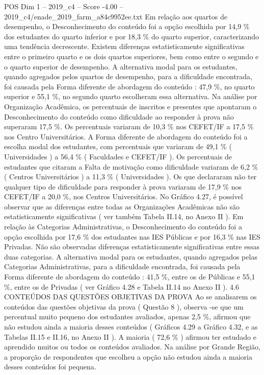\begin{textsample}{POS Dim 1 – 2019\_c4 – Score -4.00 – 2019\_c4/enade\_2019\_farm\_a84c9952ee.txt}
Em relação aos quartos de desempenho, o Desconhecimento do conteúdo foi a opção escolhida por 14,9 \% dos estudantes do quarto inferior e por 18,3 \% do quarto superior, caracterizando uma tendência decrescente.
Existem diferenças estatisticamente significativas entre o primeiro quarto e os dois quartos superiores, bem como entre o segundo e o quarto superior de desempenho.
A alternativa modal para os estudantes, quando agregados pelos quartos de desempenho, para a dificuldade encontrada, foi causada pela Forma diferente de abordagem do conteúdo : 47,9 \%, no quarto superior e 55,1 \%, no segundo quarto escolheram essa alternativa.
Na análise por Organização Acadêmica, os percentuais de inscritos e presentes que apontaram o Desconhecimento do conteúdo como dificuldade ao responder à prova não superaram 17,5 \%.
Os percentuais variaram de 10,3 \% nos CEFET/IF a 17,5 \% nos Centro Universitários.
A Forma diferente de abordagem do conteúdo foi a escolha modal dos estudantes, com percentuais que variaram de 49,1 \% ( Universidades ) a 56,4 \% ( Faculdades e CEFET/IF ).
Os percentuais de estudantes que citaram a Falta de motivação como dificuldade variaram de 6,2 \% ( Centros Universitários ) a 11,3 \% ( Universidades ).
Os que declararam não ter qualquer tipo de dificuldade para responder à prova variaram de 17,9 \% nos CEFET/IF a 20,0 \%, nos Centros Universitários.
No Gráfico 4.27, é possível observar que as diferenças entre todas as Organizações Acadêmicas não são estatisticamente significativas ( ver também Tabela II.14, no Anexo II ).
Em relação às Categorias Administrativas, o Desconhecimento do conteúdo foi a opção escolhida por 17,6 \% dos estudantes nas IES Públicas e por 16,3 \% nas IES Privadas.
Não são observadas diferenças estatisticamente significativas entre essas duas categorias.
A alternativa modal para os estudantes, quando agregados pelas Categorias Administrativas, para a dificuldade encontrada, foi causada pela Forma diferente de abordagem do conteúdo : 41,5 \%, entre os de Públicas e 55,1 \%, entre os de Privadas ( ver Gráfico 4.28 e Tabela II.14 no Anexo II ). 4.6 CONTEÚDOS DAS QUESTÕES OBJETIVAS DA PROVA Ao se analisarem os conteúdos das questões objetivas da prova ( Questão 8 ), observa -se que um percentual muito pequeno dos estudantes avaliados, apenas 2,5 \%, afirmou que não estudou ainda a maioria desses conteúdos ( Gráficos 4.29 a Gráfico 4.32, e as Tabelas II.15 e II.16, no Anexo II ).
A maioria ( 72,6 \% ) afirmou ter estudado e aprendido muitos ou todos os conteúdos avaliados.
Na análise por Grande Região, a proporção de respondentes que escolheu a opção não estudou ainda a maioria desses conteúdos foi pequena.

\end{textsample}

